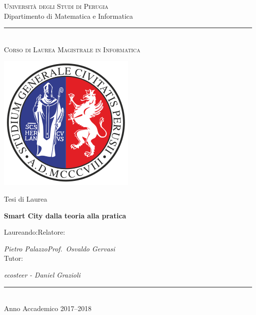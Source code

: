 \documentclass[a4paper,12pt]{report}
\title{\begin{large}\textbf{\titolotesi}\end{large}}
\author{\laureando}
\def\titolotesi{Smart City dalla teoria alla pratica} %
\def\laureando{Pietro Palazzo}       %
\def\annoaccademico{2017--2018}    %
\begin{document}
\begin{titlepage}
 \begin{center}
\textsc{\Large Universit\`a degli Studi di Perugia}\medskip\\

{\Large Dipartimento di Matematica e Informatica}\medskip\\

\rule{10mm}{0.01mm}\medskip\\

{\small \textsc{Corso di Laurea Magistrale in Informatica}}\medskip\\

\vspace*{3mm}

\includegraphics[scale=0.70]{logounipg.png}

\Large Tesi di Laurea \par\bigskip

{\large \bf \titolotesi \par}

\end{center}\par

\hspace{0.05cm}Laureando:\hspace{7.3cm}Relatore:\par

\hspace{0.0cm}\emph{\laureando}\hfill\emph{Prof.~Osvaldo Gervasi}\\

\hspace{10cm}Tutor:\par

\hfill\emph{ecosteer - Daniel Grazioli}\\

\vfill

\begin{center}
\rule{40mm}{0.01mm}\\
Anno Accademico \annoaccademico
\end{center}
\end{titlepage}
\newpage
\end{document}
